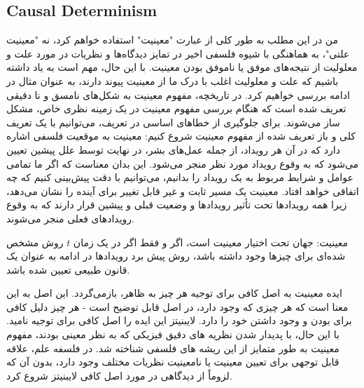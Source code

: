 \documentclass[10pt,a4paper]{article}
\begin{document}
        \subsection{Causal Determinism}
من در این مطلب به طور کلی از عبارت "معینیت" استفاده خواهم کرد، نه "معینیت علتی"، به هماهنگی با شیوه فلسفی اخیر در تمایز دیدگاه‌ها و نظریات در مورد علت و معلولیت از نتیجه‌های موفق یا ناموفق بودن معینیت. با این حال، مهم است به یاد داشته باشیم که علت و معلولیت اغلب با درک ما از معینیت پیوند دارند، به عنوان مثال در ادامه بررسی خواهیم کرد. در تاریخچه، مفهوم معینیت به شکل‌های نامسق و نا دقیقی تعریف شده است که هنگام بررسی مفهوم معینیت در یک زمینه نظری خاص، مشکل ساز می‌شوند. برای جلوگیری از خطاهای اساسی در تعریف، می‌توانیم با یک تعریف کلی و باز تعریف شده از مفهوم معینیت شروع کنیم: معینیت به موقعیت فلسفی اشاره دارد که در آن هر رویداد، از جمله عمل‌های بشر، در نهایت توسط علل پیشین تعیین می‌شود که به وقوع رویداد مورد نظر منجر می‌شود. این بدان معناست که اگر ما تمامی عوامل و شرایط مربوط به یک رویداد را بدانیم، می‌توانیم با دقت پیش‌بینی کنیم که چه اتفاقی خواهد افتاد. معینیت یک مسیر ثابت و غیر قابل تغییر برای آینده را نشان می‌دهد، زیرا همه رویدادها تحت تأثیر رویدادها و وضعیت قبلی و پیشین قرار دارند که به وقوع رویدادهای فعلی منجر می‌شوند.
            \begin{qt}
معینیت: جهان تحت اختیار معینیت است، اگر و فقط اگر در یک زمان $t$ روش مشخص شده‌ای برای چیزها وجود داشته باشد، روش پیش برد رویدادها در ادامه به عنوان یک قانون طبیعی تعیین شده باشد.
            \end{qt}
ایده معینیت به اصل کافی برای توجیه هر چیز به ظاهر، بازمی‌گردد. این اصل به این معنا است که هر چیزی که وجود دارد، در اصل قابل توضیح است - هر چیز دلیل کافی برای بودن و وجود داشتن خود را دارد. لایبنیتز این ایده را اصل کافی برای توجیه نامید. با این حال، با پدیدار شدن نظریه های دقیق فیزیکی که به نظر معینی بودند، مفهوم معینیت به طور متمایز از این ریشه های فلسفی شناخته شد. در فلسفه علم، علاقه قابل توجهی برای تعیین معینیت یا نامعینیت نظریات مختلف وجود دارد، بدون آن که لزوماً از دیدگاهی در مورد اصل کافی لایبنیتز شروع کرد.\cite{sep-determinism-causal}
\end{document}
